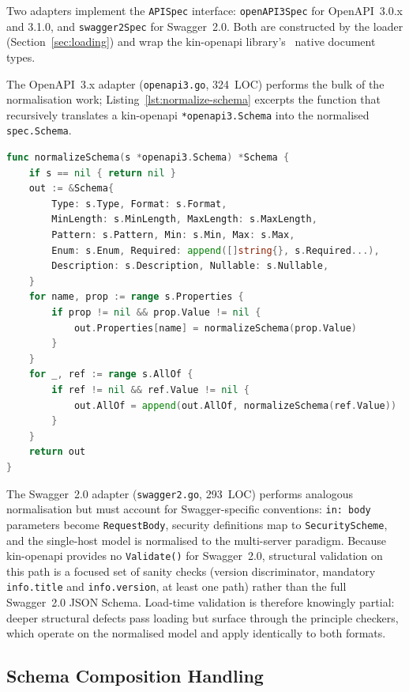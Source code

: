 Two adapters implement the \texttt{APISpec} interface: \texttt{openAPI3Spec} for OpenAPI~3.0.x and 3.1.0, and \texttt{swagger2Spec} for Swagger~2.0. Both are constructed by the loader (Section~\ref{sec:loading}) and wrap the kin-openapi library's~\cite{kin-openapi} native document types.

The OpenAPI~3.x adapter (\texttt{openapi3.go}, 324~LOC) performs the bulk of the normalisation work; Listing~\ref{lst:normalize-schema} excerpts the function that recursively translates a kin-openapi \texttt{*openapi3.Schema} into the normalised \texttt{spec.Schema}.

\begin{lstlisting}[language=Go,float=htbp,caption={Schema normalisation excerpt (\texttt{spec/openapi3.go}).},label={lst:normalize-schema}]
func normalizeSchema(s *openapi3.Schema) *Schema {
    if s == nil { return nil }
    out := &Schema{
        Type: s.Type, Format: s.Format,
        MinLength: s.MinLength, MaxLength: s.MaxLength,
        Pattern: s.Pattern, Min: s.Min, Max: s.Max,
        Enum: s.Enum, Required: append([]string{}, s.Required...),
        Description: s.Description, Nullable: s.Nullable,
    }
    for name, prop := range s.Properties {
        if prop != nil && prop.Value != nil {
            out.Properties[name] = normalizeSchema(prop.Value)
        }
    }
    for _, ref := range s.AllOf {
        if ref != nil && ref.Value != nil {
            out.AllOf = append(out.AllOf, normalizeSchema(ref.Value))
        }
    }
    return out
}
\end{lstlisting}

The Swagger~2.0 adapter (\texttt{swagger2.go}, 293~LOC) performs analogous normalisation but must account for Swagger-specific conventions: \texttt{in: body} parameters become \texttt{RequestBody}, security definitions map to \texttt{SecurityScheme}, and the single-host model is normalised to the multi-server paradigm. Because kin-openapi provides no \texttt{Validate()} for Swagger~2.0, structural validation on this path is a focused set of sanity checks (version discriminator, mandatory \texttt{info.title} and \texttt{info.version}, at least one path) rather than the full Swagger~2.0 JSON Schema. Load-time validation is therefore knowingly partial: deeper structural defects pass loading but surface through the principle checkers, which operate on the normalised model and apply identically to both formats.

\subsection{Schema Composition Handling}
\label{subsec:schema-composition}

